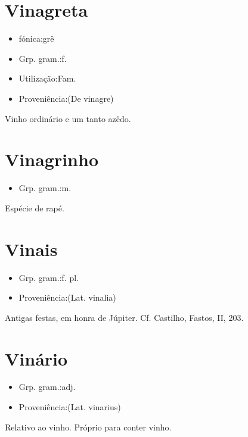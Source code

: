 \documentclass{article}
\begin{document}
\section{Vinagreta}
\begin{itemize}
\item {fónica:grê}
\end{itemize}
\begin{itemize}
\item {Grp. gram.:f.}
\end{itemize}
\begin{itemize}
\item {Utilização:Fam.}
\end{itemize}
\begin{itemize}
\item {Proveniência:(De \textunderscore vinagre\textunderscore )}
\end{itemize}
Vinho ordinário e um tanto azêdo.
\section{Vinagrinho}
\begin{itemize}
\item {Grp. gram.:m.}
\end{itemize}
Espécie de rapé.
\section{Vinais}
\begin{itemize}
\item {Grp. gram.:f. pl.}
\end{itemize}
\begin{itemize}
\item {Proveniência:(Lat. \textunderscore vinalia\textunderscore )}
\end{itemize}
Antigas festas, em honra de Júpiter. Cf. Castilho, \textunderscore Fastos\textunderscore , II, 203.
\section{Vinário}
\begin{itemize}
\item {Grp. gram.:adj.}
\end{itemize}
\begin{itemize}
\item {Proveniência:(Lat. \textunderscore vinarius\textunderscore )}
\end{itemize}
Relativo ao vinho.
Próprio para conter vinho.
\end{document}
